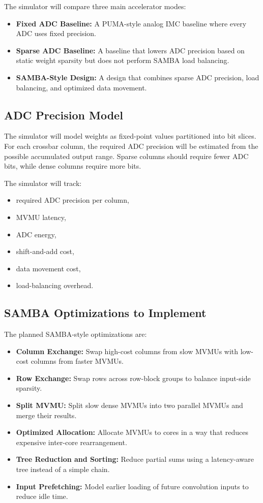 \documentclass[11pt]{article}
\begin{document}
The simulator will compare three main accelerator modes:

\begin{itemize}
    \item \textbf{Fixed ADC Baseline:} A PUMA-style analog IMC baseline where every ADC uses fixed precision.
    \item \textbf{Sparse ADC Baseline:} A baseline that lowers ADC precision based on static weight sparsity but does not perform SAMBA load balancing.
    \item \textbf{SAMBA-Style Design:} A design that combines sparse ADC precision, load balancing, and optimized data movement.
\end{itemize}

\subsection{ADC Precision Model}

The simulator will model weights as fixed-point values partitioned into bit slices. For each crossbar column, the required ADC precision will be estimated from the possible accumulated output range. Sparse columns should require fewer ADC bits, while dense columns require more bits.

The simulator will track:

\begin{itemize}
    \item required ADC precision per column,
    \item MVMU latency,
    \item ADC energy,
    \item shift-and-add cost,
    \item data movement cost,
    \item load-balancing overhead.
\end{itemize}

\subsection{SAMBA Optimizations to Implement}

The planned SAMBA-style optimizations are:

\begin{itemize}
    \item \textbf{Column Exchange:} Swap high-cost columns from slow MVMUs with low-cost columns from faster MVMUs.
    \item \textbf{Row Exchange:} Swap rows across row-block groups to balance input-side sparsity.
    \item \textbf{Split MVMU:} Split slow dense MVMUs into two parallel MVMUs and merge their results.
    \item \textbf{Optimized Allocation:} Allocate MVMUs to cores in a way that reduces expensive inter-core rearrangement.
    \item \textbf{Tree Reduction and Sorting:} Reduce partial sums using a latency-aware tree instead of a simple chain.
    \item \textbf{Input Prefetching:} Model earlier loading of future convolution inputs to reduce idle time.
\end{itemize}
\end{document}
